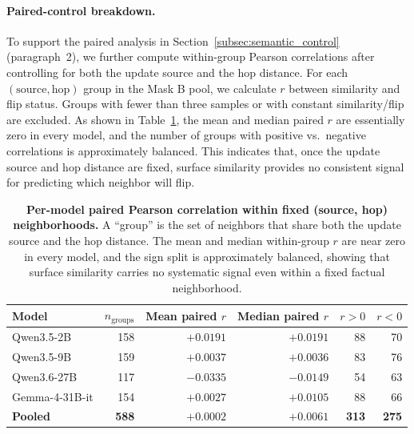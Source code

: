 \paragraph{Paired-control breakdown.}
To support the paired analysis in Section~\ref{subsec:semantic_control} (paragraph~2), we further compute within-group Pearson correlations after controlling for both the update source and the hop distance. For each $(\text{source}, \text{hop})$ group in the Mask B pool, we calculate $r$ between similarity and flip status. Groups with fewer than three samples or with constant similarity/flip are excluded. As shown in Table~\ref{tab:paired_r_per_model}, the mean and median paired $r$ are essentially zero in every model, and the number of groups with positive vs.\ negative correlations is approximately balanced. This indicates that, once the update source and hop distance are fixed, surface similarity provides no consistent signal for predicting which neighbor will flip.

\begin{table}[!htbp]
\centering
\small
\begin{tabular}{lrrrrr}
\toprule
\textbf{Model} & \textbf{$n_{\text{groups}}$} & \textbf{Mean paired $r$} & \textbf{Median paired $r$} & \textbf{$r > 0$} & \textbf{$r < 0$} \\
\midrule
Qwen3.5-2B      & 158 & $+0.0191$ & $+0.0191$ &  88 &  70 \\
Qwen3.5-9B      & 159 & $+0.0037$ & $+0.0036$ &  83 &  76 \\
Qwen3.6-27B     & 117 & $-0.0335$ & $-0.0149$ &  54 &  63 \\
Gemma-4-31B-it  & 154 & $+0.0027$ & $+0.0105$ &  88 &  66 \\
\midrule
\textbf{Pooled} & \textbf{588} & \textbf{$+0.0002$} & \textbf{$+0.0061$} & \textbf{313} & \textbf{275} \\
\bottomrule
\end{tabular}
\caption{\textbf{Per-model paired Pearson correlation within fixed (source, hop) neighborhoods.} A ``group'' is the set of neighbors that share both the update source and the hop distance. The mean and median within-group $r$ are near zero in every model, and the sign split is approximately balanced, showing that surface similarity carries no systematic signal even within a fixed factual neighborhood.}
\label{tab:paired_r_per_model}
\end{table}

















